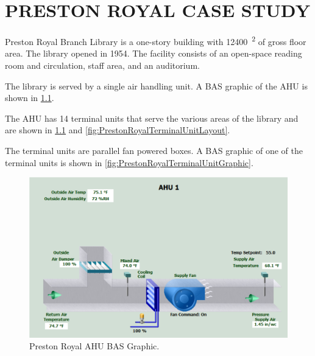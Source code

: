 \chapter{\texorpdfstring{\MakeUppercase{Preston Royal Case Study}}{Preston Royal Case Study}}

Preston Royal Branch Library is a one-story building with \SI{12400}{\feet\squared} of gross floor area. The
library opened in 1954. The facility consists of an open-space reading room and circulation, staff
area, and an auditorium.

The library is served by a single air handling unit. A BAS graphic of
the AHU is shown in \figref{} \ref{fig:PrestonRoyalAHUGraphic}. 

The AHU has 14 terminal units that serve the various areas of the
library and are shown in \figref{} \ref{fig:PrestonRoyalAHUGraphic} and
\ref{fig:PrestonRoyalTerminalUnitLayout}.

The terminal units are parallel fan powered boxes. A BAS graphic of one
of the terminal units is shown in \figref{}
\ref{fig:PrestonRoyalTerminalUnitGraphic}.

\begin{figure}
\centering
\includegraphics[width=\textwidth]{Images/PrestonRoyalAHUGraphic.PNG}
\caption{Preston Royal AHU BAS Graphic.}
\label{fig:PrestonRoyalAHUGraphic}
\end{figure}

